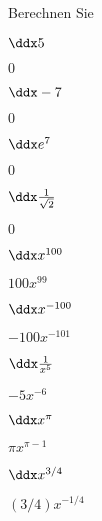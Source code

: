 \begin{exercises}

\noindent Berechnen Sie

\twocol


\begin{exercise} $\ddx 5$
\begin{answer} $0$
\end{answer}
\end{exercise}

\begin{exercise} $\ddx -7$
\begin{answer} $0$
\end{answer}
\end{exercise}

\begin{exercise} $\ddx e^7$
\begin{answer} $0$
\end{answer}
\end{exercise}

\begin{exercise} $\ddx \frac{1}{\sqrt{2}}$
\begin{answer} $0$
\end{answer}
\end{exercise}


\begin{exercise} $\ddx x^{100}$
\begin{answer} $100x^{99}$
\end{answer}
\end{exercise}

\begin{exercise} $\ddx x^{-100}$
\begin{answer} $-100x^{-101}$
\end{answer}\end{exercise}

\begin{exercise} $\ddx \frac{1}{x^5}$
\begin{answer} $-5x^{-6}$
\end{answer}\end{exercise}

\begin{exercise} $\ddx x^\pi$
\begin{answer} $\pi x^{\pi-1}$
\end{answer}\end{exercise}

\begin{exercise} $\ddx x^{3/4}$
\begin{answer} $(3/4)x^{-1/4}$
\end{answer}\end{exercise}


\end{exercises}
